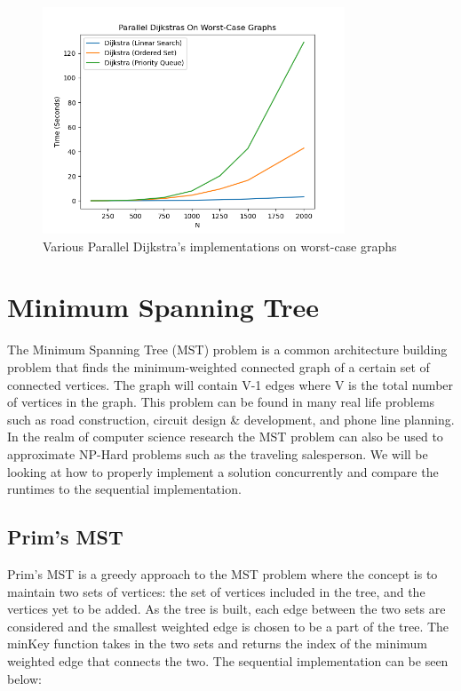 \documentclass[conference]{IEEEtran}
\begin{document}
\begin{figure}[t]
    
\end{figure}

\begin{figure}[h]
    \centering
    \includegraphics[width=9cm]{images/benchWorstCase2.png}
    \caption{Various Parallel Dijkstra's implementations on worst-case graphs}
    \label{fig:dijkstra_all}
\end{figure}



\section{Minimum Spanning Tree}
The Minimum Spanning Tree (MST) problem is a common architecture building problem that finds the minimum-weighted connected graph of a certain set of connected vertices\cite{b2}. The graph will contain V-1 edges where V is the total number of vertices in the graph. This problem can be found in many real life problems such as road construction, circuit design \& development, and phone line planning. In the realm of computer science research the MST problem can also be used to approximate NP-Hard problems such as the traveling salesperson\cite{b1}. We will be looking at how to properly implement a solution concurrently and compare the runtimes to the sequential implementation.
\par

\subsection{Prim's MST}
Prim's MST is a greedy approach to the MST problem where the concept is to maintain two sets of vertices: the set of vertices included in the tree, and the vertices yet to be added. As the tree is built, each edge between the two sets are considered and the smallest weighted edge is chosen to be a part of the tree. The minKey function takes in the two sets and returns the index of the minimum weighted edge that connects the two. The sequential implementation can be seen below:
\end{document}
